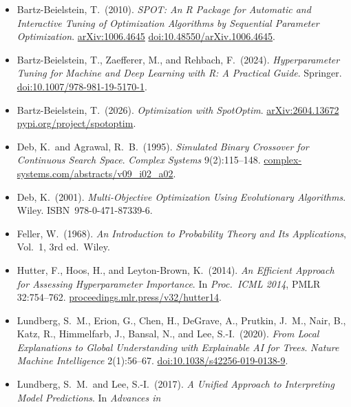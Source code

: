 \documentclass[11pt,a4paper]{article}
\begin{document}
\begin{itemize}\small
    \item Bartz-Beielstein, T.\ (2010). \emph{SPOT: An R Package for
    Automatic and Interactive Tuning of Optimization Algorithms by
    Sequential Parameter Optimization}.
    \href{https://arxiv.org/abs/1006.4645}{arXiv:1006.4645} \textbullet{}
    \href{https://doi.org/10.48550/arXiv.1006.4645}
    {doi:10.48550/arXiv.1006.4645}.
    \item Bartz-Beielstein, T., Zaefferer, M., and Rehbach, F.\ (2024).
    \emph{Hyperparameter Tuning for Machine and Deep Learning with R:
    A Practical Guide}. Springer.
    \href{https://doi.org/10.1007/978-981-19-5170-1}
    {doi:10.1007/978-981-19-5170-1}.
    \item Bartz-Beielstein, T.\ (2026). \emph{Optimization with
    SpotOptim}.
    \href{https://arxiv.org/abs/2604.13672}{arXiv:2604.13672} \textbullet{}
    \href{https://pypi.org/project/spotoptim/}{pypi.org/project/spotoptim}.
    \item Deb, K.\ and Agrawal, R.\ B.\ (1995). \emph{Simulated Binary
    Crossover for Continuous Search Space}. \emph{Complex Systems}
    9(2):115--148.
    \href{https://www.complex-systems.com/abstracts/v09_i02_a02/}
    {complex-systems.com/abstracts/v09\_i02\_a02}.
    \item Deb, K.\ (2001). \emph{Multi-Objective Optimization Using
    Evolutionary Algorithms}. Wiley. ISBN~978-0-471-87339-6.
    \item Feller, W.\ (1968). \emph{An Introduction to Probability
    Theory and Its Applications}, Vol.~1, 3rd ed.\ Wiley.
    \item Hutter, F., Hoos, H., and Leyton-Brown, K.\ (2014).
    \emph{An Efficient Approach for Assessing Hyperparameter
    Importance}. In \emph{Proc.\ ICML 2014}, PMLR 32:754--762.
    \href{https://proceedings.mlr.press/v32/hutter14.html}
    {proceedings.mlr.press/v32/hutter14}.
    \item Lundberg, S.~M., Erion, G., Chen, H., DeGrave, A., Prutkin, J.\ M.,
    Nair, B., Katz, R., Himmelfarb, J., Bansal, N., and Lee, S.-I.\
    (2020). \emph{From Local Explanations to Global Understanding with
    Explainable AI for Trees}. \emph{Nature Machine Intelligence}
    2(1):56--67.
    \href{https://doi.org/10.1038/s42256-019-0138-9}
    {doi:10.1038/s42256-019-0138-9}.
    \item Lundberg, S.~M.\ and Lee, S.-I.\ (2017). \emph{A Unified
    Approach to Interpreting Model Predictions}. In \emph{Advances in
}
\end{itemize}
\end{document}
